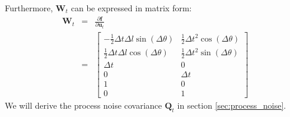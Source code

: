 \documentclass[12pt, a4paper]{article}
\begin{document}
Furthermore, $\bm{W}_{t}$ can be expressed in matrix form:
\begin{eqnarray*}
  \bm{W}_{t} & = & \frac{\partial\bm{f}}{\partial\bm{u}_{t}}\\
  & = & \begin{bmatrix}
    -\frac{1}{2}\Delta t\Delta l\sin(\Delta\theta) & \frac{1}{2}\Delta t^{2}\cos(\Delta\theta)\\
    \frac{1}{2}\Delta t\Delta l\cos(\Delta\theta) & \frac{1}{2}\Delta t^{2}\sin(\Delta\theta)\\
    \Delta t & 0\\
    0 & \Delta t\\
    1 & 0\\
    0 & 1
  \end{bmatrix}
\end{eqnarray*}
We will derive the process noise covariance $\bm{Q}_{t}$ in section \ref{sec:process_noise}.
\end{document}
